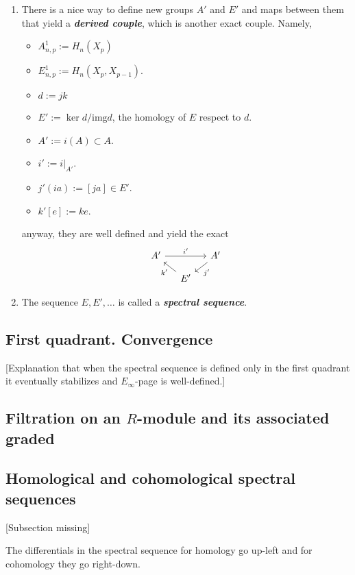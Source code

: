 \begin{remark}
\begin{definition}
\begin{enumerate}
	\item There is a nice way to define new groups $A'$ and $E'$ and maps between them that yield a \textit{\textbf{derived couple}}, which is another exact couple.	Namely,
		\begin{itemize}
			\item $A^1_{n,p}:=H_n(X_p)$
			\item $E^1_{n,p}:=H_n(X_p,X_{p-1})$.
			\item $d:=jk$
			\item $E':=\ker d/\text{img}d$, the homology of $E$ respect to $d$.
			\item $A':=i(A)\subset A$.
			\item $i':=i|_{A'}$.
			\item $j'(ia):=[ja]\in E'$.
			\item $k'[e]:=ke$.
		\end{itemize}
	anyway, they are well defined and yield the exact
	$$\begin{tikzcd}[column sep=small,row sep=small]
		A'\arrow[rr,"i'"]&&A'\arrow[dl,"j'"]\\
		&E'\arrow[ul,"k'"]
	\end{tikzcd}$$

	\item The sequence $E,E',\ldots$ is called a \textit{\textbf{spectral sequence}}.
\end{enumerate}

\subsection{First quadrant. Convergence}

[Explanation that when the spectral sequence is defined only in the first quadrant it eventually stabilizes and $E_{\infty}$-page is well-defined.]

\subsection{Filtration on an \texorpdfstring{$R$}{R}-module and its associated graded}

\subsection{Homological and cohomological spectral sequences}

[Subsection missing]

\begin{remark}
	The differentials in the spectral sequence for homology go up-left and for cohomology they go right-down.
\end{remark}


\end{definition}
\end{remark}
